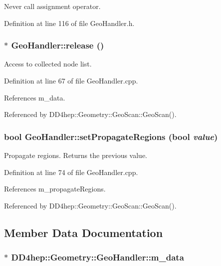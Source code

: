 Never call assignment operator. 

Definition at line 116 of file GeoHandler.h.\hypertarget{class_d_d4hep_1_1_geometry_1_1_geo_handler_afaa693916e577c74e90854f66123cc05}{
\subsubsection[{release}]{ $\ast$ GeoHandler::release ()}}
\label{class_d_d4hep_1_1_geometry_1_1_geo_handler_afaa693916e577c74e90854f66123cc05}


Access to collected node list. 

Definition at line 67 of file GeoHandler.cpp.

References m\_\-data.

Referenced by DD4hep::Geometry::GeoScan::GeoScan().\hypertarget{class_d_d4hep_1_1_geometry_1_1_geo_handler_aeaade3e58229faddb647861b301680e5}{
\subsubsection[{setPropagateRegions}]{\setlength{\rightskip}{0pt plus 5cm}bool GeoHandler::setPropagateRegions (bool {\em value})}}
\label{class_d_d4hep_1_1_geometry_1_1_geo_handler_aeaade3e58229faddb647861b301680e5}


Propagate regions. Returns the previous value. 

Definition at line 74 of file GeoHandler.cpp.

References m\_\-propagateRegions.

Referenced by DD4hep::Geometry::GeoScan::GeoScan().

\subsection{Member Data Documentation}
\hypertarget{class_d_d4hep_1_1_geometry_1_1_geo_handler_a2ac33960ec9497e7a5f064c3ae0a0747}{
\subsubsection[{m\_\-data}]{$\ast$ {\bf DD4hep::Geometry::GeoHandler::m\_\-data}}}
\label{class_d_d4hep_1_1_geometry_1_1_geo_handler_a2ac33960ec9497e7a5f064c3ae0a0747}


